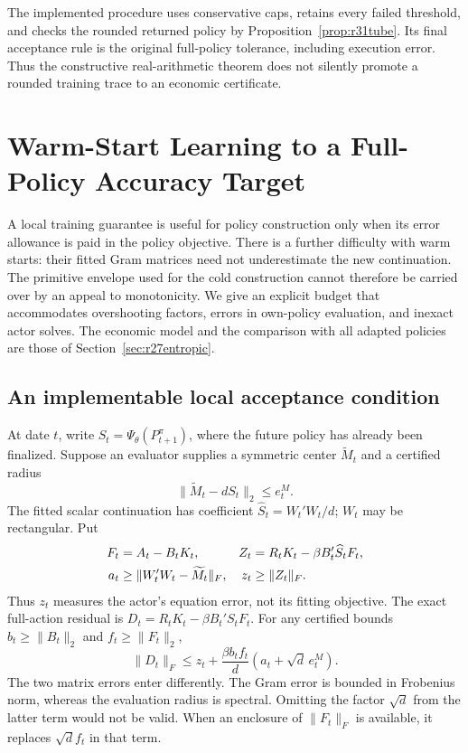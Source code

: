 \documentclass[ecta,nameyear,draft]{econsocart}
\theoremstyle{definition}
\theoremstyle{remark}
\begin{document}
The implemented procedure uses conservative caps, retains every failed
threshold, and checks the rounded returned policy by
Proposition~\ref{prop:r31tube}. Its final acceptance rule is the original
full-policy tolerance, including execution error. Thus the constructive
real-arithmetic theorem does not silently promote a rounded training trace
to an economic certificate.

\section{Warm-Start Learning to a Full-Policy Accuracy Target}
\label{sec:r34robust}
A local training guarantee is useful for policy construction only when its
error allowance is paid in the policy objective. There is a further difficulty
with warm starts: their fitted Gram matrices need not underestimate the new
continuation. The primitive envelope used for the cold construction cannot
therefore be carried over by an appeal to monotonicity. We give an explicit
budget that accommodates overshooting factors, errors in own-policy
evaluation, and inexact actor solves. The economic model and the comparison
with all adapted policies are those of Section~\ref{sec:r27entropic}.

\subsection{An implementable local acceptance condition}
At date $t$, write $S_t=\Psi_\theta(P_{t+1}^{\pi})$, where the future policy
has already been finalized. Suppose an evaluator supplies a symmetric center
$\widetilde M_t$ and a certified radius
\[
 \|\widetilde M_t-dS_t\|_2\leq e_t^M.
\]
The fitted scalar continuation has coefficient
$\widehat S_t=W_t'W_t/d$; $W_t$ may be rectangular. Put
\begin{align}
 F_t&=A_t-B_tK_t,&
 Z_t&=R_tK_t-\beta B_t'\widehat S_tF_t,\notag\\
 a_t&\geq\|W_t'W_t-\widetilde M_t\|_F,&
 z_t&\geq\|Z_t\|_F.\label{eq:r34localdata}
\end{align}
Thus $z_t$ measures the actor's equation error, not its fitting objective.
The exact full-action residual is
$D_t=R_tK_t-\beta B_t'S_tF_t$. For any certified bounds
$b_t\geq\|B_t\|_2$ and $f_t\geq\|F_t\|_2$,
\begin{equation}\label{eq:r34mixed}
 \|D_t\|_F\leq z_t+
 \frac{\beta b_tf_t}{d}(a_t+\sqrt d\,e_t^M).
\end{equation}
The two matrix errors enter differently. The Gram error is bounded in
Frobenius norm, whereas the evaluation radius is spectral. Omitting the
factor $\sqrt d$ from the latter term would not be valid. When an enclosure
of $\|F_t\|_F$ is available, it replaces $\sqrt d f_t$ in that term.
\end{document}
